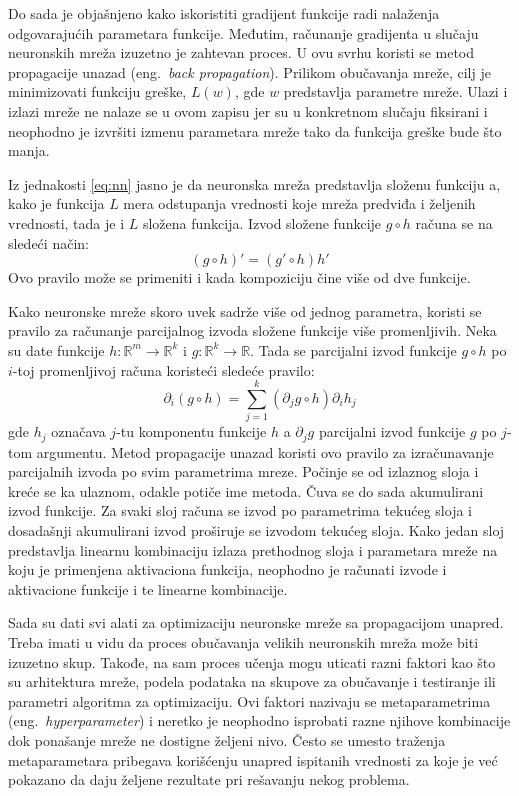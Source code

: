 Do sada je objašnjeno kako iskoristiti gradijent funkcije radi nalaženja odgovarajućih parametara funkcije. Međutim, računanje gradijenta u slučaju neuronskih mreža izuzetno je zahtevan proces. U ovu svrhu koristi se metod propagacije unazad (eng.~{\em back propagation}). Prilikom obučavanja mreže, cilj je minimizovati funkciju greške, $L(w)$, gde $w$ predstavlja parametre mreže. Ulazi i izlazi mreže ne nalaze se u ovom zapisu jer su u konkretnom slučaju fiksirani i neophodno je izvršiti izmenu parametara mreže tako da funkcija greške bude što manja. 
\par 
Iz jednakosti \eqref{eq:nn} jasno je da neuronska mreža predstavlja složenu funkciju a, kako je funkcija $L$ mera odstupanja vrednosti koje mreža predviđa i željenih vrednosti, tada je i $L$ složena funkcija. Izvod složene funkcije $g \circ h$ računa se na sledeći način:
\begin{equation}
	(g \circ h)' = (g' \circ h)h'
\end{equation}
Ovo pravilo može se primeniti i kada kompoziciju čine više od dve funkcije.
\par 
Kako neuronske mreže skoro uvek sadrže više od jednog parametra, koristi se pravilo za računanje parcijalnog izvoda složene funkcije više promenljivih. Neka su date funkcije $h:\mathbb{R}^m\rightarrow\mathbb{R}^k$ i $g:\mathbb{R}^k\rightarrow\mathbb{R}$. Tada se parcijalni izvod funkcije $g \circ h$ po $i$-toj promenljivoj računa koristeći sledeće pravilo:
\begin{equation}
	\partial_i(g \circ h) = \sum_{j=1}^{k}(\partial_j g \circ h) \partial_i h_j	
\end{equation}
gde $h_j$ označava $j$-tu komponentu funkcije $h$ a $\partial_j g$ parcijalni izvod funkcije $g$ po $j$-tom argumentu. Metod propagacije unazad koristi ovo pravilo za izračunavanje parcijalnih izvoda po svim parametrima mreze. Počinje se od izlaznog sloja i kreće se ka ulaznom, odakle potiče ime metoda. Čuva se do sada akumulirani izvod funkcije. Za svaki sloj računa se izvod po parametrima tekućeg sloja i dosadašnji akumulirani izvod proširuje se izvodom tekućeg sloja. Kako jedan sloj predstavlja linearnu kombinaciju izlaza prethodnog sloja i parametara mreže na koju je primenjena aktivaciona funkcija, neophodno je računati izvode i aktivacione funkcije i te linearne kombinacije.
\par 
Sada su dati svi alati za optimizaciju neuronske mreže sa propagacijom unapred. Treba imati u vidu da proces obučavanja velikih neuronskih mreža može biti izuzetno skup. Takođe, na sam proces učenja mogu uticati razni faktori kao što su arhitektura mreže, podela podataka na skupove za obučavanje i testiranje ili parametri algoritma za optimizaciju. Ovi faktori nazivaju se metaparametrima (eng.~{\em hyperparameter}) i neretko je neophodno isprobati razne njihove kombinacije dok ponašanje mreže ne dostigne željeni nivo. Često se umesto traženja metaparametara pribegava korišćenju unapred ispitanih vrednosti za koje je već pokazano da daju željene rezultate pri rešavanju nekog problema.



